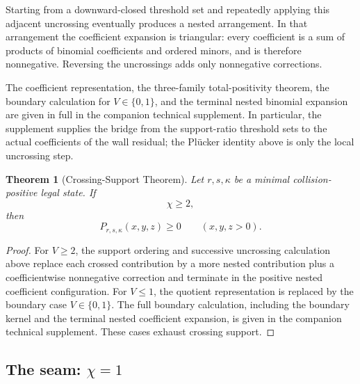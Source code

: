 \documentclass[11pt]{article}
\newtheorem{theorem}{Theorem}[section]
\theoremstyle{definition}
\begin{document}
Starting from a downward-closed threshold set and repeatedly applying this adjacent uncrossing eventually produces a nested arrangement.  In that arrangement the coefficient expansion is triangular: every coefficient is a sum of products of binomial coefficients and ordered minors, and is therefore nonnegative.  Reversing the uncrossings adds only nonnegative corrections.

The coefficient representation, the three-family total-positivity theorem, the boundary calculation for \(V\in\{0,1\}\), and the terminal nested binomial expansion are given in full in the companion technical supplement.  In particular, the supplement supplies the bridge from the support-ratio threshold sets to the actual coefficients of the wall residual; the Pl\"ucker identity above is only the local uncrossing step.

\begin{theorem}[Crossing-Support Theorem]
\label{thm:crossing-support}
Let \(r,s,\kappa\) be a minimal collision-positive legal state. If
\begin{equation*}
\chi\ge2,
\end{equation*}
then
\begin{equation*}
P_{r,s,\kappa}(x,y,z)\ge0
\qquad(x,y,z>0).
\end{equation*}
\end{theorem}

\begin{proof}
For \(V\ge2\), the support ordering and successive uncrossing calculation above replace each crossed contribution by a more nested contribution plus a coefficientwise nonnegative correction and terminate in the positive nested coefficient configuration.  For \(V\le1\), the quotient representation is replaced by the boundary case \(V\in\{0,1\}\).  The full boundary calculation, including the boundary kernel and the terminal nested coefficient expansion, is given in the companion technical supplement.  These cases exhaust crossing support.
\end{proof}

\subsection{The seam: \texorpdfstring{\(\chi=1\)}{chi = 1}}
\label{one-sided-seam-chi1}
\end{document}
